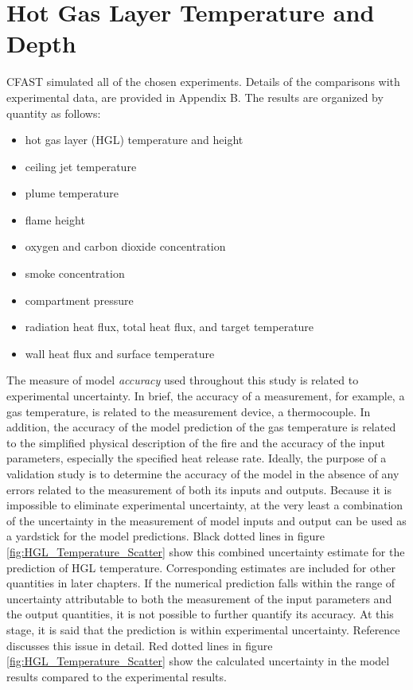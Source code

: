 \chapter{Hot Gas Layer Temperature and Depth}

\label{HGL:Chapter}

CFAST simulated all of the chosen experiments.  Details of the comparisons with experimental data, are provided in Appendix B.  The results are organized by quantity as follows:

\begin{itemize}
\item hot gas layer (HGL) temperature and height
\item ceiling jet temperature
\item plume temperature
\item flame height
\item oxygen and carbon dioxide concentration
\item smoke concentration
\item compartment pressure
\item radiation heat flux, total heat flux, and target temperature
\item wall heat flux and surface temperature
\end{itemize}

The measure of model \emph{accuracy} used throughout this study is related to experimental uncertainty. In brief, the accuracy of a measurement, for example, a gas temperature, is related to the measurement device, a thermocouple. In addition, the accuracy of the model prediction of the gas temperature is related to the simplified physical description of the fire and the accuracy of the input parameters, especially the specified heat release rate. Ideally, the purpose of a validation study is to determine the accuracy of the model in the absence of any errors related to the measurement of both its inputs and outputs. Because it is impossible to eliminate experimental uncertainty, at the very least a combination of the uncertainty in the measurement of model inputs and output can be used as a yardstick for the model predictions. Black dotted lines in figure \ref{fig:HGL_Temperature_Scatter} show this combined uncertainty estimate for the prediction of HGL temperature. Corresponding estimates are included for other quantities in later chapters. If the numerical prediction falls within the range of uncertainty attributable to both the measurement of the input parameters and the output quantities, it is not possible to further quantify its accuracy. At this stage, it is said that the prediction is within experimental uncertainty. Reference \cite{NRCNUREG1824}  discusses this issue in detail. Red dotted lines in figure \ref{fig:HGL_Temperature_Scatter} show the calculated uncertainty in the model results compared to the experimental results.

